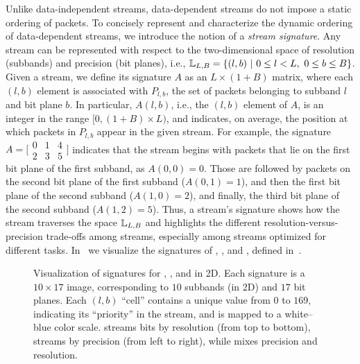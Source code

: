 Unlike data-independent streams, data-dependent streams do not impose a static ordering of packets.
To concisely represent and characterize the dynamic ordering of data-dependent streams, we introduce
the notion of a \emph{stream signature}. Any stream can be represented with respect to the
two-dimensional space of resolution (subbands) and precision (bit planes), i.e.,
\mbox{${\mathbb L}_{L,B}=\{(l,b)\ |\ 0\leq l < L,\ 0\leq b \leq B\}$.} Given a stream, we define its
signature $A$ as an $L \times (1+B)$ matrix, where each $(l,b)$ element is associated with
$P_{l,b}$, the set of packets belonging to subband $l$ and bit plane $b$. In particular, $A(l,b)$,
i.e., the $(l,b)$ element of $A$, is an integer in the range $[0, (1+B)\times L)$, and indicates, on
average, the position at which packets in $P_{l,b}$ appear in the given stream. For example, the
signature $A=\bigl[ \begin{smallmatrix}0 & 1 & 4\\
2 & 3 & 5\end{smallmatrix}\bigr]$ indicates that the stream begins with packets that lie on the
first bit plane of the first subband, as $A(0,0)=0$. Those are followed by packets on the second
bit plane of the first subband ($A(0,1)=1$), and then the first bit plane of the second subband
($A(1,0)=2$), and finally, the third bit plane of the second subband ($A(1,2)=5$). Thus, a
stream's signature shows how the stream traverses the space ${\mathbb L}_{L,B}$ and highlights the
different resolution-versus-precision trade-offs among streams, especially among \sopt streams
optimized for different tasks. In~ we visualize the signatures of
\sbit, \slvl, and \swav, defined in~.

\begin{figure}[!t]
\centering
\vspace{-0.5em}
\caption{Visualization of signatures for \slvl, \sbit, and \swav in 2D. Each signature is a
$10\times 17$ image, corresponding to $10$ subbands (in 2D) and $17$ bit planes. Each $(l,b)$
``cell'' contains a unique value from $0$ to $169$, indicating its ``priority'' in the stream, and
is mapped to a white--blue color scale. \slvl streams bits by resolution (from top to bottom), \sbit
streams by precision (from left to right), while \swav mixes precision and resolution.}
\label{fig:example-signatures}
\vspace{-1.75em}
\end{figure}

